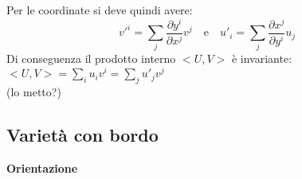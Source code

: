 Per le coordinate si deve quindi avere:
$$
   v'^i = \sum_j \frac{\partial y^i}{\partial x^j} v^j \mathrm{\quad e \quad}
   u'_i = \sum_j \frac{\partial x^j}{\partial y^i} u_j
$$
Di conseguenza il prodotto interno $<U,V> $ è invariante:
$ <U,V> = \sum_i u_i v^i = \sum_j u'_j v^j $\\
(lo metto?)\\
\subsection{Varietà con bordo}
\textbf{Orientazione}\\

